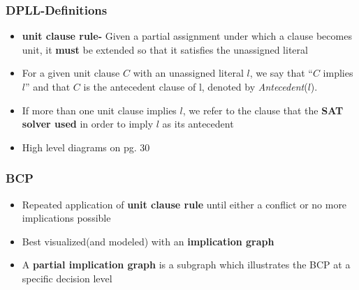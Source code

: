 \documentclass{beamer}
\begin{document}
\begin{frame}

 \frametitle{DPLL-Definitions}
 
 \begin{itemize}
 
   \item  \textbf{unit clause rule-} Given a partial assignment under which a clause becomes unit, it \textbf{must} be extended so that it satisfies the unassigned literal
   
  \item For a given unit clause \ensuremath{C} with an unassigned literal \ensuremath{l}, we say that ``\ensuremath{C} implies \ensuremath{l}'' and that \ensuremath{C} is the antecedent clause of l, denoted by \emph{Antecedent}(\ensuremath{l}).
 
 \item If more than one unit clause implies \ensuremath{l}, we refer to the clause that the \textbf{SAT solver used} in order to imply \ensuremath{l} as its antecedent

 
 \item High level diagrams on pg. 30
 
 \end{itemize}
 
\end{frame}

\begin{frame}

 \frametitle{BCP}
 
 \begin{itemize}
 
 \item  Repeated application of \textbf{unit clause rule} until either a conflict or no more implications possible
 \item Best visualized(and modeled) with an \textbf{implication graph}
 \item A \textbf{partial implication graph} is a subgraph which illustrates the BCP at a specific decision level
 
 \end{itemize}
 
\end{frame}
\end{document}
